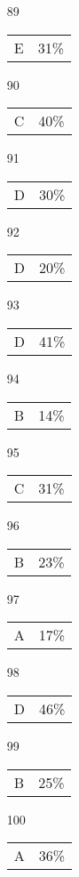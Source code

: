 \documentclass{article}
\begin{document}
\begin{multicols}{4}
\begin{enumerate}
    \item[89] \begin{tabular}{cc} E & 31\%\end{tabular}
    
    \item[90] \begin{tabular}{cc} C & 40\%\end{tabular}
    
       \item[]
    
    \item[91] \begin{tabular}{cc} D & 30\%\end{tabular}

    \item[92] \begin{tabular}{cc} D & 20\%\end{tabular}
    
    \item[93] \begin{tabular}{cc} D & 41\%\end{tabular}
    
    \item[94] \begin{tabular}{cc} B &14\%\end{tabular}
    
    \item[95] \begin{tabular}{cc} C & 31\%\end{tabular}
    
       \item[]
    
    \item[96] \begin{tabular}{cc} B & 23\%\end{tabular}
    
    \item[97] \begin{tabular}{cc} A & 17\%\end{tabular}
    
    \item[98] \begin{tabular}{cc} D & 46\%\end{tabular}
    
    \item[99] \begin{tabular}{cc} B & 25\%\end{tabular}
    
    \item[100] \begin{tabular}{cc} A & 36\%\end{tabular}
    
       \item[]
    
\end{enumerate}
\end{multicols}
\end{document}
